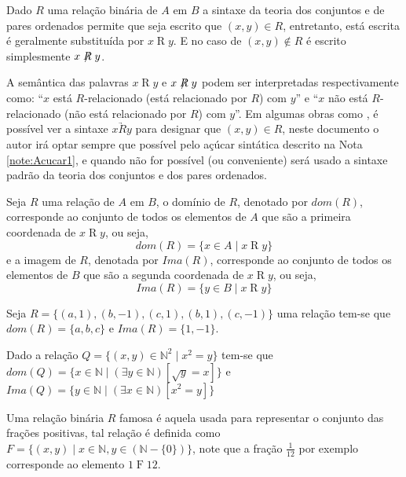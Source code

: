 \begin{atencao}\label{note:Acucar1}
  Dado $R$ uma relação binária de $A$ em $B$ a sintaxe da teoria dos conjuntos e de pares ordenados permite que seja escrito que $(x, y) \in R$, entretanto, está escrita é geralmente substituída por $x\mathrel{R}y$. E no caso de $(x,y) \notin R$ é escrito simplesmente $x\centernot{R}y$.
\end{atencao}

A semântica das palavras $x\mathrel{R}y$ e $x\centernot{R}y$ podem ser interpretadas respectivamente como: ``$x$ está $R$-relacionado (está relacionado por $R$) com $y$'' e ``$x$ não está $R$-relacionado (não está relacionado por $R$) com $y$''. Em algumas obras como \cite{carmo2013}, é possível ver a sintaxe $x \underrightarrow{R} y$ para designar que $(x, y) \in R$, neste documento o autor irá optar sempre que possível pelo açúcar sintática descrito na Nota \ref{note:Acucar1}, e quando não for possível (ou conveniente) será usado a sintaxe padrão da teoria dos conjuntos e dos pares ordenados.

\begin{definicao}\label{def:DominioImagemRelacoes}
	Seja $R$ uma relação de $A$ em $B$, o domínio de $R$, denotado por $dom(R)$, corresponde ao conjunto de todos os elementos de $A$ que são a primeira coordenada de $x\mathrel{R}y$, ou seja, 
	$$dom(R) = \{x \in A \mid x\mathrel{R}y\}$$
	e a imagem de $R$, denotada por $Ima(R)$, corresponde ao conjunto de todos os elementos de $B$ que são a segunda coordenada de $x\mathrel{R}y$, ou seja, 
	$$Ima(R) = \{y \in B \mid x\mathrel{R}y\}$$
\end{definicao}

\begin{exemplo}\label{exe:RelacaoBinaria1}
	Seja $R = \{(a, 1), (b, -1), (c, 1), (b, 1), (c, -1)\}$ uma relação tem-se que $dom(R) = \{a, b, c\}$ e $Ima(R) = \{1, -1\}$.
\end{exemplo}

\begin{exemplo}
	Dado a relação $Q = \{(x, y) \in \mathbb{N}^2 \mid x^2 = y\}$ tem-se que $dom(Q) = \{x \in \mathbb{N} \mid (\exists y \in \mathbb{N})[\sqrt{y} = x]\}$ e $Ima(Q) = \{y \in \mathbb{N} \mid (\exists x \in \mathbb{N})[x^2 = y]\}$
\end{exemplo}

\begin{exemplo}
	Uma relação binária $R$ famosa é aquela usada para representar o conjunto das frações positivas, tal relação é definida como $F = \{(x, y)\mid x \in \mathbb{N}, y \in (\mathbb{N}-\{0\})\}$, note que a fração $\displaystyle\frac{1}{12}$ por exemplo corresponde ao elemento $1\mathrel{F}12$.
\end{exemplo}

